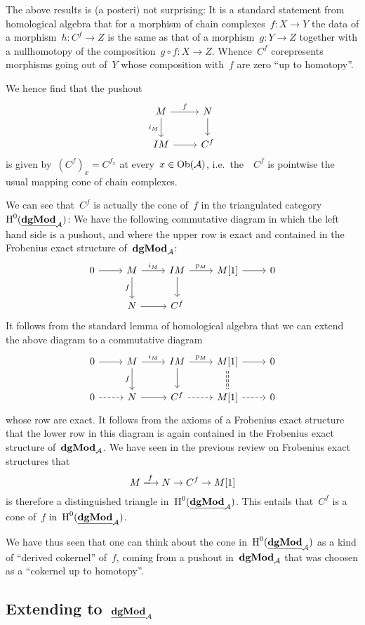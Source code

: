 \documentclass[a4paper,10pt]{scrartcl}
\begin{document}
\begin{remark}
  The above results is (a posteri) not surprising:
  It is a standard statement from homological algebra that for a morphism of chain complexes~$f \colon X \to Y$ the data of a morphism~$h \colon C^f \to Z$ is the same as that of a morphism~$g \colon Y \to Z$ together with a nullhomotopy of the composition~$g \circ f \colon X \to Z$.
  Whence~$C^f$ corepresents morphisms going out of~$Y$ whose composition with~$f$ are zero \enquote{up to homotopy}.
\end{remark}

We hence find that the pushout
\[
  \begin{tikzcd}
    M
    \arrow{r}[above]{f}
    \arrow{d}[left]{i_M}
    &
    N
    \arrow{d}
    \\
    IM
    \arrow{r}
    &
    C^f
  \end{tikzcd}
\]
is given by~$(C^f)_x = C^{f_x}$ at every~$x \in \operatorname{Ob}(\mathcal{A})$, i.e.\ the~{\dgmodule{$\Acat$}}~$C^f$ is pointwise the usual mapping cone of chain complexes.

We can see that~$C^f$ is actually the cone of~$f$ in the triangulated category~$\operatorname{H}^0(\underline{\mathbf{dgMod}}_{\mathcal{A}})$:
We have the following commutative diagram in which the left hand side is a pushout, and where the upper row is exact and contained in the Frobenius exact structure of~$\mathbf{dgMod}_{\mathcal{A}}$:
\[
  \begin{tikzcd}
    0
    \arrow{r}
    &
    M
    \arrow{r}[above]{i_M}
    \arrow{d}[left]{f}
    &
    IM
    \arrow{r}[above]{p_M}
    \arrow{d}
    &
    M[1]
    \arrow{r}
    &
    0
    \\
    {}
    &
    N
    \arrow{r}
    &
    C^f
    &
    {}
    &
    {}
  \end{tikzcd}
\]
It follows from the standard lemma of homological algebra that we can extend the above diagram to a commutative diagram
\[
  \begin{tikzcd}
    0
    \arrow{r}
    &
    M
    \arrow{r}[above]{i_M}
    \arrow{d}[left]{f}
    &
    IM
    \arrow{r}[above]{p_M}
    \arrow{d}
    &
    M[1]
    \arrow{r}
    \arrow[dashed,equal]{d}
    &
    0
    \\
    0
    \arrow[dashed]{r}
    &
    N
    \arrow{r}
    &
    C^f
    \arrow[dashed]{r}
    &
    M[1]
    \arrow[dashed]{r}
    &
    0
  \end{tikzcd}
\]
whose row are exact.
It follows from the axioms of a Frobenius exact structure that the lower row in this diagram is again contained in the Frobenius exact structure of~$\mathbf{dgMod}_{\mathcal{A}}$.
We have seen in the previous review on Frobenius exact structures that
\[
  M
  \xlongto{f}
  N
  \to
  C^f
  \to
  M[1]
\]
is therefore a distinguished triangle in~$\operatorname{H}^0(\underline{\mathbf{dgMod}}_{\mathcal{A}})$.
This entails that~$C^f$ is a cone of~$f$ in~$\operatorname{H}^0(\underline{\mathbf{dgMod}}_{\mathcal{A}})$.

We have thus seen that one can think about the cone in~$\operatorname{H}^0(\underline{\mathbf{dgMod}}_{\mathcal{A}})$ as a kind of \enquote{derived cokernel} of~$f$, coming from a pushout in~$\mathbf{dgMod}_{\mathcal{A}}$ that was choosen as a \enquote{cokernel up to homotopy}.



\subsection{Extending to~$\underline{\mathbf{dgMod}}_{\mathcal{A}}$}
\end{document}
